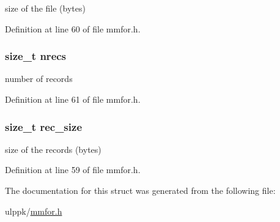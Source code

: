 size of the file (bytes) 



Definition at line 60 of file mmfor.\-h.

\hypertarget{struct__mmfor__header_a218d36060722882d76c8d10b73edb6a6}{
\subsubsection[{nrecs}]{\setlength{\rightskip}{0pt plus 5cm}size\-\_\-t nrecs}}\label{struct__mmfor__header_a218d36060722882d76c8d10b73edb6a6}


number of records 



Definition at line 61 of file mmfor.\-h.

\hypertarget{struct__mmfor__header_a6af15626e40c23bd7d5b67f5a54c8344}{
\subsubsection[{rec\-\_\-size}]{\setlength{\rightskip}{0pt plus 5cm}size\-\_\-t rec\-\_\-size}}\label{struct__mmfor__header_a6af15626e40c23bd7d5b67f5a54c8344}


size of the records (bytes) 



Definition at line 59 of file mmfor.\-h.



The documentation for this struct was generated from the following file\-:\begin{DoxyCompactItemize}
\item 
ulppk/\hyperlink{mmfor_8h}{mmfor.\-h}\end{DoxyCompactItemize}
